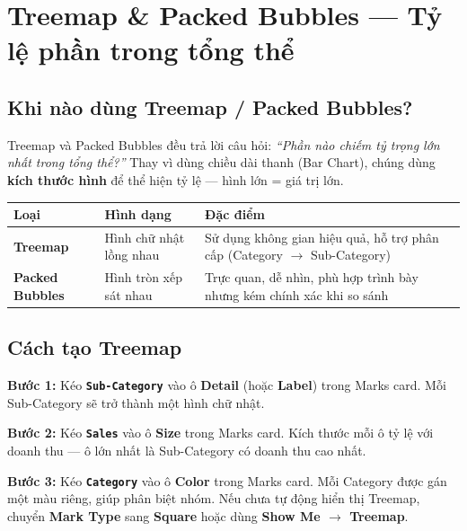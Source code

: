 \documentclass[12pt]{article}
\begin{document}
\section{Treemap \& Packed Bubbles --- Tỷ lệ phần trong tổng thể}

\subsection{Khi nào dùng Treemap / Packed Bubbles?}

\noindent Treemap và Packed Bubbles đều trả lời câu hỏi: \textit{``Phần nào chiếm tỷ trọng lớn nhất trong tổng thể?''} Thay vì dùng chiều dài thanh (Bar Chart), chúng dùng \textbf{kích thước hình} để thể hiện tỷ lệ --- hình lớn = giá trị lớn.

\begin{center}
\renewcommand{\arraystretch}{1.4}
\begin{tabularx}{\linewidth}{l X X}
\toprule
\textbf{Loại} & \textbf{Hình dạng} & \textbf{Đặc điểm} \\
\midrule
\textbf{Treemap} & Hình chữ nhật lồng nhau & Sử dụng không gian hiệu quả, hỗ trợ phân cấp (Category $\rightarrow$ Sub-Category) \\
\textbf{Packed Bubbles} & Hình tròn xếp sát nhau & Trực quan, dễ nhìn, phù hợp trình bày nhưng kém chính xác khi so sánh \\
\bottomrule
\end{tabularx}
\end{center}

\subsection{Cách tạo Treemap}

\noindent \textbf{Bước 1:} Kéo \textbf{\texttt{Sub-Category}} vào ô \textbf{Detail} (hoặc \textbf{Label}) trong Marks card. Mỗi Sub-Category sẽ trở thành một hình chữ nhật.

\noindent \textbf{Bước 2:} Kéo \textbf{\texttt{Sales}} vào ô \textbf{Size} trong Marks card. Kích thước mỗi ô tỷ lệ với doanh thu --- ô lớn nhất là Sub-Category có doanh thu cao nhất.

\noindent \textbf{Bước 3:} Kéo \textbf{\texttt{Category}} vào ô \textbf{Color} trong Marks card. Mỗi Category được gán một màu riêng, giúp phân biệt nhóm. Nếu chưa tự động hiển thị Treemap, chuyển \textbf{Mark Type} sang \textbf{Square} hoặc dùng \textbf{Show Me $\rightarrow$ Treemap}.
\end{document}
